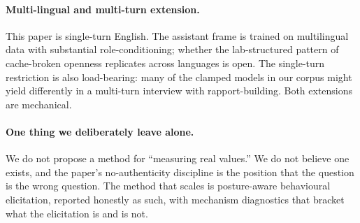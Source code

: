 \paragraph{Multi-lingual and multi-turn extension.}
This paper is single-turn English. The assistant frame is trained on multilingual data with substantial role-conditioning; whether the lab-structured pattern of cache-broken openness replicates across languages is open. The single-turn restriction is also load-bearing: many of the clamped models in our corpus might yield differently in a multi-turn interview with rapport-building. Both extensions are mechanical.

\paragraph{One thing we deliberately leave alone.}
We do not propose a method for ``measuring real values.'' We do not believe one exists, and the paper's no-authenticity discipline is the position that the question is the wrong question. The method that scales is posture-aware behavioural elicitation, reported honestly as such, with mechanism diagnostics that bracket what the elicitation is and is not.
